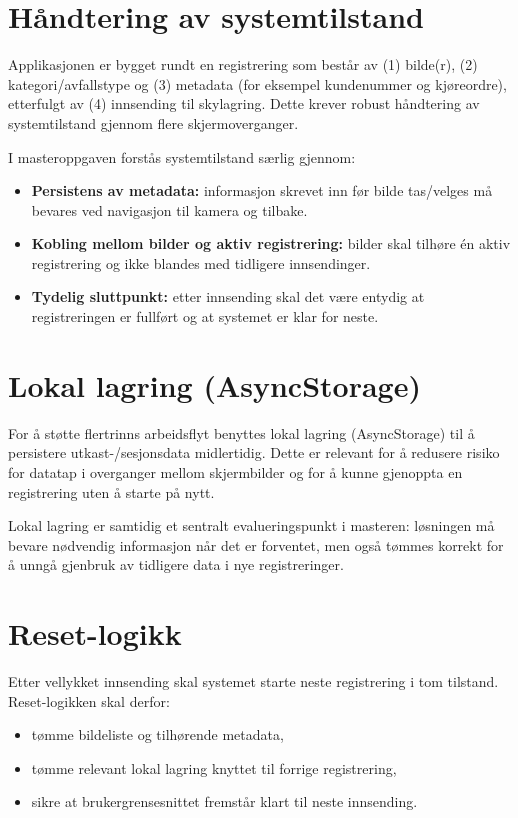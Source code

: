\section{Håndtering av systemtilstand}
\label{sec:systemtilstand}
Applikasjonen er bygget rundt en registrering som består av (1) bilde(r), (2) kategori/avfallstype og (3) metadata (for eksempel kundenummer og kjøreordre), etterfulgt av (4) innsending til skylagring. Dette krever robust håndtering av systemtilstand gjennom flere skjermoverganger.

I masteroppgaven forstås systemtilstand særlig gjennom:
\begin{itemize}
  \item \textbf{Persistens av metadata:} informasjon skrevet inn før bilde tas/velges må bevares ved navigasjon til kamera og tilbake.
  \item \textbf{Kobling mellom bilder og aktiv registrering:} bilder skal tilhøre én aktiv registrering og ikke blandes med tidligere innsendinger.
  \item \textbf{Tydelig sluttpunkt:} etter innsending skal det være entydig at registreringen er fullført og at systemet er klar for neste.
\end{itemize}

\section{Lokal lagring (AsyncStorage)}
\label{sec:asyncstorage}
For å støtte flertrinns arbeidsflyt benyttes lokal lagring (AsyncStorage) til å persistere utkast-/sesjonsdata midlertidig. Dette er relevant for å redusere risiko for datatap i overganger mellom skjermbilder og for å kunne gjenoppta en registrering uten å starte på nytt.

Lokal lagring er samtidig et sentralt evalueringspunkt i masteren: løsningen må bevare nødvendig informasjon når det er forventet, men også tømmes korrekt for å unngå gjenbruk av tidligere data i nye registreringer.

\section{Reset-logikk}
\label{sec:reset}
Etter vellykket innsending skal systemet starte neste registrering i tom tilstand. Reset-logikken skal derfor:
\begin{itemize}
  \item tømme bildeliste og tilhørende metadata,
  \item tømme relevant lokal lagring knyttet til forrige registrering,
  \item sikre at brukergrensesnittet fremstår klart til neste innsending.
\end{itemize}

